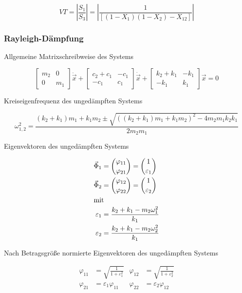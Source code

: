 \begin{equation}\label{eq:VT2DOF}
VT = \left\lvert \frac{S_1}{S_3} \right\rvert = \left\lvert \frac{1}{[(1 - X_1)(1 - X_2) - X_{12}]} \right\rvert
\end{equation}


\subsubsection{Rayleigh-Dämpfung}
\label{sec:rayleigh}


Allgemeine Matrixschreibweise des Systems

\begin{equation}
\begin{bmatrix}
m_2  & 0\\
0    & m_1
\end{bmatrix}
\ddot{\vec{x}} +
\begin{bmatrix}
c_2 + c_1  & -c_1\\
-c_1       & c_1
\end{bmatrix}
\dot{\vec{x}} +
\begin{bmatrix}
k_2 + k_1  & -k_1\\
-k_1       & k_1
\end{bmatrix}
\vec{x} = 0
\end{equation}

Kreiseigenfrequenz des ungedämpften Systems

\begin{equation*}
\omega_{1,2}^2 = \frac{(k_2 + k_1) m_1 + k_1 m_2 \pm \sqrt{((k_2 + k_1) m_1 + k_1 m_2)^2 - 4 m_2 m_1 k_2 k_1}}{2 m_2 m_1}
\end{equation*}

Eigenvektoren des ungedämpften Systems

\begin{align*}
\vec{\Phi}_1 &= \binom{\varphi_{11}}{\varphi_{21}} = \binom{1}{\varepsilon_1}\\
\vec{\Phi}_2 &= \binom{\varphi_{12}}{\varphi_{22}} = \binom{1}{\varepsilon_2}\\
\intertext{mit}
\varepsilon_1 &= \frac{k_2 + k_1 - m_2 \omega_1^2}{k_1}\\
\varepsilon_2 &= \frac{k_2 + k_1 - m_2 \omega_2^2}{k_1}
\end{align*}

Nach Betragsgröße normierte Eigenvektoren des ungedämpften Systems

\begin{align*}
\varphi_{11} &= \sqrt{\frac{1}{1 + \varepsilon_1^2}}  &  \varphi_{12} &= \sqrt{\frac{1}{1 + \varepsilon_2^2}}\\
\varphi_{21} &= \varepsilon_1 \varphi_{11}            &  \varphi_{22} &= \varepsilon_2 \varphi_{12}
\end{align*}

